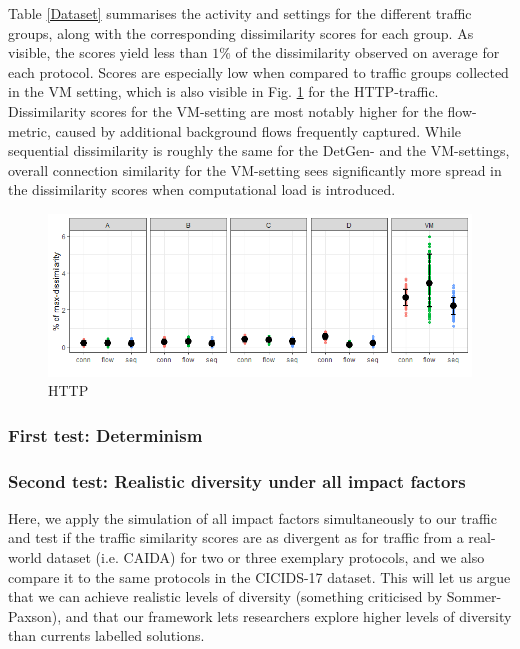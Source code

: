 \documentclass{article}
\begin{document}
Table \ref{Dataset} summarises the activity and settings for the different traffic groups, along with the corresponding dissimilarity scores for each group. As visible, the scores yield less than $1\%$ of the dissimilarity observed on average for each protocol. Scores are especially low when compared to traffic groups collected in the VM setting, which is also visible in Fig. \ref{determ-metric} for the HTTP-traffic. Dissimilarity scores for the VM-setting are most notably higher for the flow-metric, caused by additional background flows frequently captured. While sequential dissimilarity is roughly the same for the DetGen- and the VM-settings, overall connection similarity for the VM-setting sees significantly more spread in the dissimilarity scores when computational load is introduced.


\begin{figure}
\centering
\includegraphics[width=1\textwidth]{images/Exp1.png}
\caption{HTTP}\label{determ-metric}
\end{figure}


\subsubsection{First test: Determinism}



\subsubsection{Second test: Realistic diversity under all impact factors}


Here, we apply the simulation of all impact factors simultaneously to our traffic and test if the traffic similarity scores are as divergent as for traffic from a real-world dataset (i.e. CAIDA) for two or three exemplary protocols, and we also compare it to the same protocols in the CICIDS-17 dataset. This will let us argue that we can achieve realistic levels of diversity (something criticised by Sommer-Paxson), and that our framework lets researchers explore higher levels of diversity than currents labelled solutions.
\end{document}
